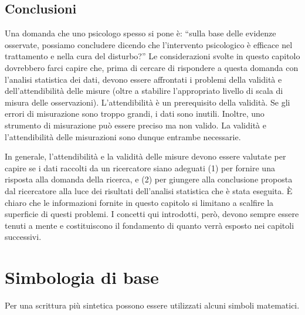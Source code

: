 \documentclass[
]{memoir}
\theoremstyle{definition}
\theoremstyle{definition}
\theoremstyle{definition}
\theoremstyle{definition}
\theoremstyle{remark}
\begin{document}
\hypertarget{conclusioni}{%
\section*{Conclusioni}\label{conclusioni}}

Una domanda che uno psicologo spesso si pone è: ``sulla base delle
evidenze osservate, possiamo concludere dicendo che l'intervento
psicologico è efficace nel trattamento e nella cura del disturbo?'' Le
considerazioni svolte in questo capitolo dovrebbero farci capire che,
prima di cercare di rispondere a questa domanda con l'analisi statistica
dei dati, devono essere affrontati i problemi della validità e
dell'attendibilità delle misure (oltre a stabilire l'appropriato livello
di scala di misura delle osservazioni). L'attendibilità è un
prerequisito della validità. Se gli errori di misurazione sono troppo
grandi, i dati sono inutili. Inoltre, uno strumento di misurazione può
essere preciso ma non valido. La validità e l'attendibilità delle
misurazioni sono dunque entrambe necessarie.

In generale, l'attendibilità e la validità delle misure devono essere
valutate per capire se i dati raccolti da un ricercatore siano adeguati
(1) per fornire una risposta alla domanda della ricerca, e (2) per
giungere alla conclusione proposta dal ricercatore alla luce dei
risultati dell'analisi statistica che è stata eseguita. È chiaro che le
informazioni fornite in questo capitolo si limitano a scalfire la
superficie di questi problemi. I concetti qui introdotti, però, devono
sempre essere tenuti a mente e costituiscono il fondamento di quanto
verrà esposto nei capitoli successivi.

\hypertarget{appendix-appendix}{%
\appendix}


\hypertarget{simbologia-di-base}{%
\chapter{Simbologia di base}\label{simbologia-di-base}}

Per una scrittura più sintetica possono essere utilizzati alcuni simboli
matematici.
\end{document}
